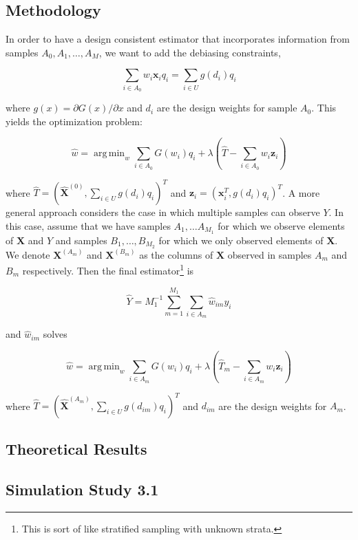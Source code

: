 \documentclass[12pt]{article}
\DeclareMathOperator*{\argmin}{arg\,min}
\renewcommand{\bf}[1]{\mathbf{#1}}
\begin{document}
\subsection{Methodology}

In order to have a design consistent estimator that incorporates information from
samples $A_0, A_1, \dots, A_M$, we want to add the debiasing constraints, 

$$ \sum_{i \in A_0} w_{i} \bf x_i q_i = \sum_{i \in U} g(d_i) q_i $$ 

where $g(x) = \partial G(x) / \partial x$ and $d_i$ are the design weights for
sample $A_0$. This yields the optimization problem:

\begin{equation}\label{eq:dc3}
  \hat w = \argmin_w \sum_{i \in A_0} G(w_i) q_i + \lambda\left(\hat T - \sum_{i
  \in A_0} w_i \bf z_i\right)
\end{equation}

where $\hat T = (\hat{\bf X}^{(0)}, \sum_{i \in U} g(d_i) q_i)^T$ and 
$\bf z_i = (\bf x_i^T, g(d_i)q_i)^T$. A more general approach considers the case
in which multiple samples can observe $Y$. In this case, assume that we have
samples $A_1, \dots A_{M_1}$ for which we observe elements of $\bf X$ and $Y$
and samples $B_1, \dots, B_{M_2}$ for which we only observed elements of $\bf
X$. We denote $\bf X^{(A_m)}$ and $\bf X^{(B_m)}$ as the columns of $\bf X$
observed in samples $A_m$ and $B_m$ respectively. Then the final
estimator\footnote{This is sort of like stratified sampling with unknown strata.}
is 

$$ \hat Y = M_1^{-1} \sum_{m = 1}^{M_1} \sum_{i \in A_m} \hat w_{im} y_i $$

and $\hat w_{im}$ solves  

\begin{equation}\label{eq:dc32}
  \hat w = \argmin_w \sum_{i \in A_m} G(w_i) q_i + \lambda\left(\hat T_m - \sum_{i
  \in A_m} w_i \bf z_i\right)
\end{equation}

where $\hat T = (\hat{\bf X}^{(A_m)}, \sum_{i \in U} g(d_{im}) q_i)^T$ and $d_{im}$
are the design weights for $A_m$.

\subsection{Theoretical Results}

\subsection{Simulation Study 3.1}
\end{document}
